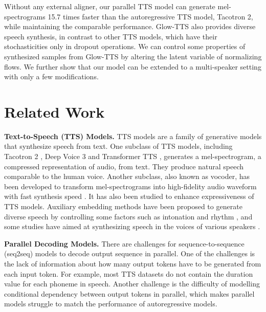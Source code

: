 \documentclass{article}
\begin{document}
Without any external aligner, our parallel TTS model can generate mel-spectrograms 15.7 times faster than the autoregressive TTS model, Tacotron 2, while maintaining the comparable performance. Glow-TTS also provides diverse speech synthesis, in contrast to other TTS models, which have their stochasticities only in dropout operations. We can control some properties of synthesized samples from Glow-TTS by altering the latent variable of normalizing flows. We further show that our model can be extended to a multi-speaker setting with only a few modifications.


\section{Related Work}


\textbf{Text-to-Speech (TTS) Models.} TTS models are a family of generative models that synthesize speech from text. One subclass of TTS models, including Tacotron 2 \cite{shen2018natural}, Deep Voice 3 \cite{ping2017deep} and Transformer TTS \cite{li2019neural}, generates a mel-spectrogram, a compressed representation of audio, from text. They produce natural speech comparable to the human voice.
Another subclass, also known as vocoder, has been developed to transform mel-spectrograms into high-fidelity audio waveform \cite{shen2018natural, van2016wavenet} with fast synthesis speed \cite{kalchbrenner2018efficient, oord2017parallel, prenger2019waveglow}. It has also been studied to enhance expressiveness of TTS models. Auxiliary embedding methods have been proposed to generate diverse speech by controlling some factors such as intonation and rhythm \cite{skerry2018towards, wang2018style}, and some studies have aimed at synthesizing speech in the voices of various speakers \cite{jia2018transfer, gibiansky2017deep}.


\textbf{Parallel Decoding Models.} There are challenges for sequence-to-sequence (seq2seq) models to decode output sequence in parallel. One of the challenges is the lack of information about how many output tokens have to be generated from each input token. For example, most TTS datasets do not contain the duration value for each phoneme in speech. Another challenge is the difficulty of modelling conditional dependency between output tokens in parallel, which makes parallel models struggle to match the performance of autoregressive models. 
\end{document}
